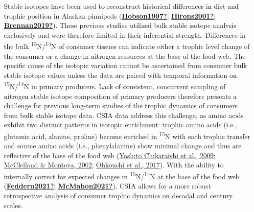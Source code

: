 \documentclass [11pt, proquest] {uwthesis}[2015/03/03]
\begin{document}
Stable isotopes have been used to reconstruct historical differences in diet and trophic position in Alaskan pinnipeds (\protect\hyperlink{ref-Hobson1997}{\textbf{Hobson1997?}}; \protect\hyperlink{ref-Hirons2001}{\textbf{Hirons2001?}}; \protect\hyperlink{ref-Brennan2019}{\textbf{Brennan2019?}}). These previous studies utilized bulk stable isotope analysis exclusively and were therefore limited in their inferential strength. Differences in the bulk \textsuperscript{15}N/\textsuperscript{14}N of consumer tissues can indicate either a trophic level change of the consumer or a change in nitrogen resources at the base of the food web. The specific cause of the isotopic variation cannot be ascertained from consumer bulk stable isotope values unless the data are paired with temporal information on \textsuperscript{15}N/\textsuperscript{14}N in primary producers. Lack of consistent, concurrent sampling of nitrogen stable isotope composition of primary producers therefore presents a challenge for previous long-term studies of the trophic dynamics of consumers from bulk stable isotope data. CSIA data address this challenge, as amino acids exhibit two distinct patterns in isotopic enrichment: trophic amino acids (i.e., glutamic acid, alanine, proline) become enriched in \textsuperscript{15}N with each trophic transfer and source amino acids (i.e., phenylalanine) show minimal change and thus are reflective of the base of the food web (\protect\hyperlink{ref-Chikaraishi2009}{Yoshito Chikaraishi et al., 2009}; \protect\hyperlink{ref-McClelland2002}{McClelland \& Montoya, 2002}; \protect\hyperlink{ref-Ohkouchi2017}{Ohkouchi et al., 2017}). With the ability to internally correct for expected changes in \textsuperscript{15}N/\textsuperscript{14}N at the base of the food web (\protect\hyperlink{ref-Feddern2021}{\textbf{Feddern2021?}}; \protect\hyperlink{ref-McMahon2021}{\textbf{McMahon2021?}}), CSIA allows for a more robust retrospective analysis of consumer trophic dynamics on decadal and century scales.
\end{document}
